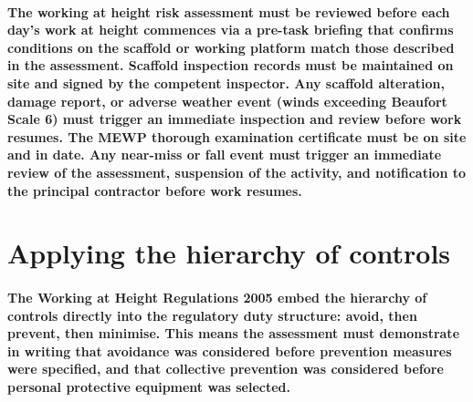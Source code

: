 \paragraph{The working at height risk assessment must be reviewed before each day's work at height commences via a pre-task briefing that confirms conditions on the scaffold or working platform match those described in the assessment. Scaffold inspection records must be maintained on site and signed by the competent inspector. Any scaffold alteration, damage report, or adverse weather event (winds exceeding Beaufort Scale 6) must trigger an immediate inspection and review before work resumes. The MEWP thorough examination certificate must be on site and in date. Any near-miss or fall event must trigger an immediate review of the assessment, suspension of the activity, and notification to the principal contractor before work resumes.}


\section{Applying the hierarchy of controls}

\paragraph{The Working at Height Regulations 2005 embed the hierarchy of controls directly into the regulatory duty structure: avoid, then prevent, then minimise. This means the assessment must demonstrate in writing that avoidance was considered before prevention measures were specified, and that collective prevention was considered before personal protective equipment was selected.}


